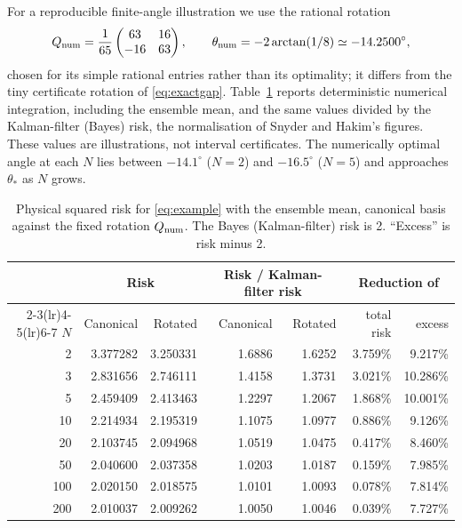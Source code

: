 \documentclass[11pt,a4paper]{article}
\numberwithin{equation}{section}
\theoremstyle{remark}\newtheorem{remark}[theorem]{Remark}
\begin{document}
For a reproducible finite-angle illustration we use the rational rotation
\begin{equation}\label{eq:numericrot}
 Q_{\rm num}=\frac1{65}\begin{pmatrix}63&16\\-16&63\end{pmatrix},
 \qquad\theta_{\rm num}=-2\arctan(1/8)\simeq-14.2500^\circ ,
\end{equation}
chosen for its simple rational entries rather than its optimality; it differs from the tiny
certificate rotation of \eqref{eq:exactgap}. Table~\ref{tab:numeric} reports deterministic
numerical integration, including the ensemble mean, and the same values divided by the
Kalman-filter (Bayes) risk, the normalisation of Snyder and Hakim's figures. These values are
illustrations, not interval certificates. The numerically optimal angle at each \(N\) lies
between \(-14.1^\circ\) (\(N=2\)) and \(-16.5^\circ\) (\(N=5\)) and approaches \(\theta_*\) as \(N\) grows.

\begin{table}[ht]
\centering
\caption{Physical squared risk for \eqref{eq:example} with the ensemble mean, canonical basis
against the fixed rotation \(Q_{\rm num}\). The Bayes (Kalman-filter) risk is 2. ``Excess'' is risk
minus 2.}
\label{tab:numeric}
\small
\begin{tabular}{rrrrrrr}
\toprule
& \multicolumn{2}{c}{Risk} & \multicolumn{2}{c}{Risk / Kalman-filter risk} & \multicolumn{2}{c}{Reduction of}\\
\cmidrule(lr){2-3}\cmidrule(lr){4-5}\cmidrule(lr){6-7}
\(N\)&Canonical&Rotated&Canonical&Rotated&total risk&excess\\
\midrule
2&3.377282&3.250331&1.6886&1.6252&3.759\%&9.217\%\\
3&2.831656&2.746111&1.4158&1.3731&3.021\%&10.286\%\\
5&2.459409&2.413463&1.2297&1.2067&1.868\%&10.001\%\\
10&2.214934&2.195319&1.1075&1.0977&0.886\%&9.126\%\\
20&2.103745&2.094968&1.0519&1.0475&0.417\%&8.460\%\\
50&2.040600&2.037358&1.0203&1.0187&0.159\%&7.985\%\\
100&2.020150&2.018575&1.0101&1.0093&0.078\%&7.814\%\\
200&2.010037&2.009262&1.0050&1.0046&0.039\%&7.727\%\\
\bottomrule
\end{tabular}
\end{table}
\end{document}

